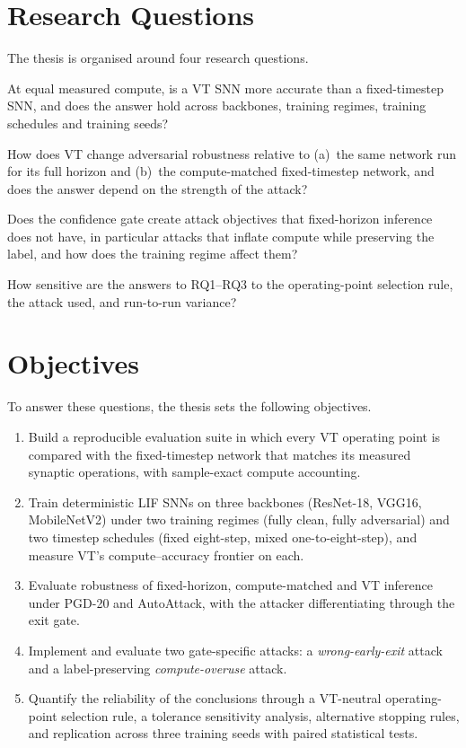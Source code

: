 \section{Research Questions}
\label{sec:intro-rqs}

The thesis is organised around four research questions.

\begin{description}[leftmargin=1.2cm, style=nextline]
    \item[RQ1 (Efficiency)] At equal measured compute, is a VT SNN more accurate than a fixed-timestep SNN, and does the answer hold across backbones, training regimes, training schedules and training seeds?
    \item[RQ2 (Robustness)] How does VT change adversarial robustness relative to (a)~the same network run for its full horizon and (b)~the compute-matched fixed-timestep network, and does the answer depend on the strength of the attack?
    \item[RQ3 (Attack surface)] Does the confidence gate create attack objectives that fixed-horizon inference does not have, in particular attacks that inflate compute while preserving the label, and how does the training regime affect them?
    \item[RQ4 (Evaluation reliability)] How sensitive are the answers to RQ1--RQ3 to the operating-point selection rule, the attack used, and run-to-run variance?
\end{description}

\section{Objectives}
\label{sec:intro-objectives}

To answer these questions, the thesis sets the following objectives.

\begin{enumerate}[label=\textbf{O\arabic*.}, leftmargin=1.2cm]
    \item Build a reproducible evaluation suite in which every VT operating point is compared with the fixed-timestep network that matches its measured synaptic operations, with sample-exact compute accounting.
    \item Train deterministic LIF SNNs on three backbones (ResNet-18, VGG16, MobileNetV2) under two training regimes (fully clean, fully adversarial) and two timestep schedules (fixed eight-step, mixed one-to-eight-step), and measure VT's compute--accuracy frontier on each.
    \item Evaluate robustness of fixed-horizon, compute-matched and VT inference under PGD-20 and AutoAttack, with the attacker differentiating through the exit gate.
    \item Implement and evaluate two gate-specific attacks: a \emph{wrong-early-exit} attack and a label-preserving \emph{compute-overuse} attack.
    \item Quantify the reliability of the conclusions through a VT-neutral operating-point selection rule, a tolerance sensitivity analysis, alternative stopping rules, and replication across three training seeds with paired statistical tests.
\end{enumerate}

